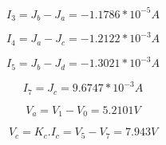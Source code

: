 \begin{equation}
  I_3 = J_b - J_a = - 1.1786*10^{-5} A
  \label{i3}
\end{equation}


\begin{equation}
  I_4 = J_a - J_c = - 1.2122*10^{-3} A
  \label{i4}
\end{equation}


\begin{equation}
  I_5 = J_b - J_d = - 1.3021*10^{-3} A
  \label{i5}
\end{equation}


\begin{equation}
  I_7 = J_c = 9.6747*10^{-3} A
  \label{i7}
\end{equation}


\begin{equation}
  V_a = V_1 - V_0 = 5.2101 V
  \label{va}
\end{equation}


\begin{equation}
  V_c = K_c.I_c = V_5 - V_7 = 7.943 V
  \label{vc}
\end{equation}




